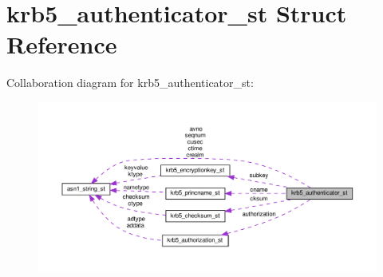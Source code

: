 \hypertarget{structkrb5__authenticator__st}{}\section{krb5\+\_\+authenticator\+\_\+st Struct Reference}
\label{structkrb5__authenticator__st}


Collaboration diagram for krb5\+\_\+authenticator\+\_\+st\+:
\nopagebreak
\begin{figure}[H]
\begin{center}
\leavevmode
\includegraphics[width=350pt]{structkrb5__authenticator__st__coll__graph}
\end{center}
\end{figure}
